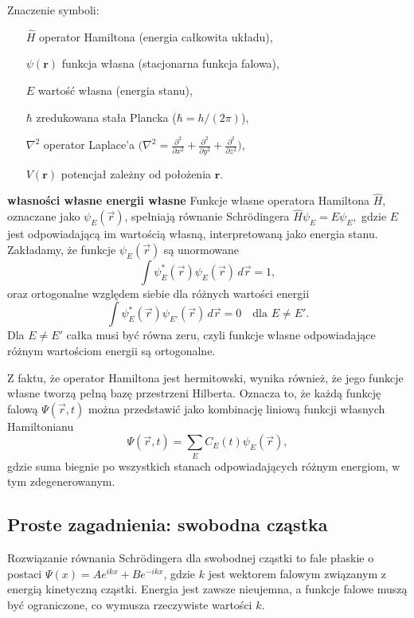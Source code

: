 \bigskip
\noindent
Znaczenie symboli:
\begin{itemize}
  \item[\(\hat{H}\)] operator Hamiltona (energia całkowita układu),
  \item[\(\psi(\mathbf{r})\)] funkcja własna (stacjonarna funkcja falowa),
  \item[\(E\)] wartość własna (energia stanu),
  \item[\(\hbar\)] zredukowana stała Plancka (\(\hbar = h/(2\pi)\)),
  \item[\(\nabla^2\)] operator Laplace’a 
    \(\bigl(\nabla^2 = \tfrac{\partial^2}{\partial x^2}
                        + \tfrac{\partial^2}{\partial y^2}
                        + \tfrac{\partial^2}{\partial z^2}\bigr)\),
  \item[\(V(\mathbf{r})\)] potencjał zależny od położenia \(\mathbf{r}\).
\end{itemize}
\textbf{własności własne energii własne}
Funkcje własne operatora Hamiltona $\hat{H}$, oznaczane jako $\psi_E(\vec{r})$, spełniają równanie Schrödingera $\hat{H} \psi_E = E \psi_E,$ gdzie $E$ jest odpowiadającą im wartością własną, interpretowaną jako energia stanu. Zakładamy, że funkcje $\psi_E(\vec{r})$ są unormowane
$$
\int \psi_E^*(\vec{r}) \psi_E(\vec{r}) \, d\vec{r} = 1,
$$
oraz ortogonalne względem siebie dla różnych wartości energii
$$
\int \psi_E^*(\vec{r}) \psi_{E'}(\vec{r}) \, d\vec{r} = 0
\quad \text{dla } E \ne E'.
$$
Dla $E \ne E'$ całka musi być równa zeru, czyli funkcje własne odpowiadające różnym wartościom energii są ortogonalne.

Z faktu, że operator Hamiltona jest hermitowski, wynika również, że jego funkcje własne tworzą pełną bazę przestrzeni Hilberta. Oznacza to, że każdą funkcję falową $\Psi(\vec{r}, t)$ można przedstawić jako kombinację liniową funkcji własnych Hamiltonianu
$$
\Psi(\vec{r}, t) = \sum_E C_E(t) \psi_E(\vec{r}),
$$
gdzie suma biegnie po wszystkich stanach odpowiadających różnym energiom, w tym zdegenerowanym.

\subsection{Proste zagadnienia: swobodna cząstka}

Rozwiązanie równania Schrödingera dla swobodnej cząstki to fale płaskie o postaci $\Psi(x) = A e^{ikx} + B e^{-ikx}$, gdzie
$k$ jest wektorem falowym związanym z energią kinetyczną cząstki. Energia jest zawsze nieujemna, a funkcje falowe muszą być
ograniczone, co wymusza rzeczywiste wartości $k$.


